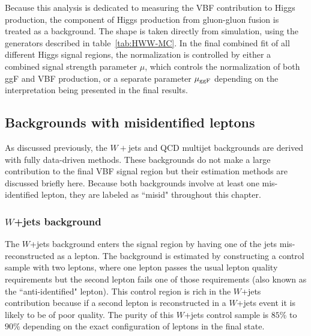 Because this analysis is dedicated to measuring the VBF contribution to Higgs production, the component of Higgs production from gluon-gluon fusion is treated as a background. The shape is taken directly from simulation, using the generators described in table~\ref{tab:HWW-MC}. In the final combined fit of all different Higgs signal regions, the normalization is controlled by either a combined signal strength parameter $\mu$, which controls the normalization of both ggF and VBF production, or a separate parameter $\mu_{\rm ggF}$ depending on the interpretation being presented in the final results.  

\subsection{Backgrounds with misidentified leptons}

As discussed previously, the $W+$jets and QCD multijet backgrounds are derived with fully data-driven methods. These backgrounds do not make a large contribution to the final VBF signal region but their estimation methods are discussed briefly here. Because both backgrounds involve at least one mis-identified lepton, they are labeled as ``misid" throughout this chapter.

\subsubsection{$W$+jets background}

The $W$+jets background enters the signal region by having one of the jets mis-reconstructed as a lepton. The background is estimated by constructing a control sample with two leptons, where one lepton passes the usual lepton quality requirements but the second lepton fails one of those requirements (also known as the ``anti-identified" lepton). This control region is rich in the $W$+jets contribution because if a second lepton is reconstructed in a $W$+jets event it is likely to be of poor quality. The purity of this $W$+jets control sample is $85$\% to $90$\% depending on the exact configuration of leptons in the final state.


